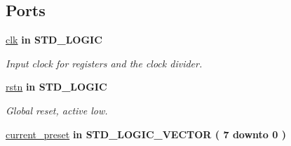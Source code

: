 \subsection*{Ports}
 \begin{DoxyCompactItemize}
\item 
\hypertarget{classseven__seg__control_a8120037e0ee47c35ba2d79242209c72e}{\hyperlink{classseven__seg__control_a8120037e0ee47c35ba2d79242209c72e}{clk}  {\bfseries {\bfseries \textcolor{vhdlkeyword}{in}\textcolor{vhdlchar}{ }}} {\bfseries \textcolor{comment}{S\-T\-D\-\_\-\-L\-O\-G\-I\-C}\textcolor{vhdlchar}{ }} }\label{classseven__seg__control_a8120037e0ee47c35ba2d79242209c72e}

\begin{DoxyCompactList}\small\item\em Input clock for registers and the clock divider. \end{DoxyCompactList}\item 
\hypertarget{classseven__seg__control_aba021aec4b477b89079bb58ccadcc67e}{\hyperlink{classseven__seg__control_aba021aec4b477b89079bb58ccadcc67e}{rstn}  {\bfseries {\bfseries \textcolor{vhdlkeyword}{in}\textcolor{vhdlchar}{ }}} {\bfseries \textcolor{comment}{S\-T\-D\-\_\-\-L\-O\-G\-I\-C}\textcolor{vhdlchar}{ }} }\label{classseven__seg__control_aba021aec4b477b89079bb58ccadcc67e}

\begin{DoxyCompactList}\small\item\em Global reset, active low. \end{DoxyCompactList}\item 
\hypertarget{classseven__seg__control_abdc5a927ef7ee61296cb6236260e149a}{\hyperlink{classseven__seg__control_abdc5a927ef7ee61296cb6236260e149a}{current\-\_\-preset}  {\bfseries {\bfseries \textcolor{vhdlkeyword}{in}\textcolor{vhdlchar}{ }}} {\bfseries \textcolor{comment}{S\-T\-D\-\_\-\-L\-O\-G\-I\-C\-\_\-\-V\-E\-C\-T\-O\-R}\textcolor{vhdlchar}{ }\textcolor{vhdlchar}{(}\textcolor{vhdlchar}{ }\textcolor{vhdlchar}{ } \textcolor{vhdldigit}{7} \textcolor{vhdlchar}{ }\textcolor{vhdlchar}{ }\textcolor{vhdlchar}{ }\textcolor{vhdlkeyword}{downto}\textcolor{vhdlchar}{ }\textcolor{vhdlchar}{ }\textcolor{vhdlchar}{ } \textcolor{vhdldigit}{0} \textcolor{vhdlchar}{ }\textcolor{vhdlchar}{)}\textcolor{vhdlchar}{ }} }\label{classseven__seg__control_abdc5a927ef7ee61296cb6236260e149a}


\end{DoxyCompactItemize}
